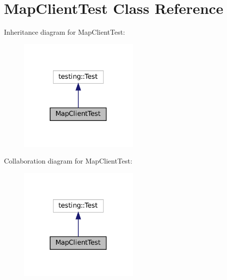 \hypertarget{classMapClientTest}{}\section{Map\+Client\+Test Class Reference}
\label{classMapClientTest}


Inheritance diagram for Map\+Client\+Test\+:
\nopagebreak
\begin{figure}[H]
\begin{center}
\leavevmode
\includegraphics[width=165pt]{classMapClientTest__inherit__graph}
\end{center}
\end{figure}


Collaboration diagram for Map\+Client\+Test\+:
\nopagebreak
\begin{figure}[H]
\begin{center}
\leavevmode
\includegraphics[width=165pt]{classMapClientTest__coll__graph}
\end{center}
\end{figure}
